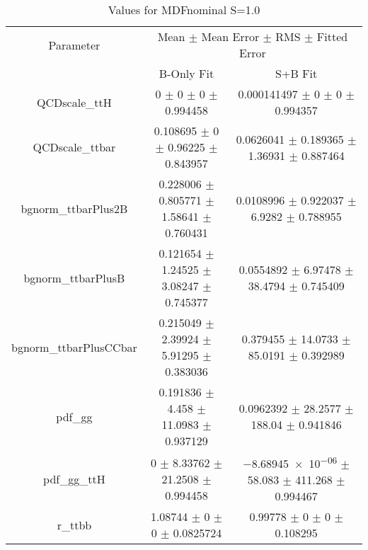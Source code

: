 \begin{table}
\centering
\caption{Values for MDFnominal S=1.0}
\begin{tabular}{ccc}
\toprule
Parameter & \multicolumn{2}{c}{Mean $\pm$ Mean Error $\pm$ RMS $\pm$ Fitted Error}\\
 & B-Only Fit & S+B Fit\\
\midrule
QCDscale\_ttH & \num{0} $\pm$ \num{0} $\pm$ \num{0} $\pm$ \num{0.994458} & \num{0.000141497} $\pm$ \num{0} $\pm$ \num{0} $\pm$ \num{0.994357}\\
QCDscale\_ttbar & \num{0.108695} $\pm$ \num{0} $\pm$ \num{0.96225} $\pm$ \num{0.843957} & \num{0.0626041} $\pm$ \num{0.189365} $\pm$ \num{1.36931} $\pm$ \num{0.887464}\\
bgnorm\_ttbarPlus2B & \num{0.228006} $\pm$ \num{0.805771} $\pm$ \num{1.58641} $\pm$ \num{0.760431} & \num{0.0108996} $\pm$ \num{0.922037} $\pm$ \num{6.9282} $\pm$ \num{0.788955}\\
bgnorm\_ttbarPlusB & \num{0.121654} $\pm$ \num{1.24525} $\pm$ \num{3.08247} $\pm$ \num{0.745377} & \num{0.0554892} $\pm$ \num{6.97478} $\pm$ \num{38.4794} $\pm$ \num{0.745409}\\
bgnorm\_ttbarPlusCCbar & \num{0.215049} $\pm$ \num{2.39924} $\pm$ \num{5.91295} $\pm$ \num{0.383036} & \num{0.379455} $\pm$ \num{14.0733} $\pm$ \num{85.0191} $\pm$ \num{0.392989}\\
pdf\_gg & \num{0.191836} $\pm$ \num{4.458} $\pm$ \num{11.0983} $\pm$ \num{0.937129} & \num{0.0962392} $\pm$ \num{28.2577} $\pm$ \num{188.04} $\pm$ \num{0.941846}\\
pdf\_gg\_ttH & \num{0} $\pm$ \num{8.33762} $\pm$ \num{21.2508} $\pm$ \num{0.994458} & \num{-8.68945e-06} $\pm$ \num{58.083} $\pm$ \num{411.268} $\pm$ \num{0.994467}\\
r\_ttbb & \num{1.08744} $\pm$ \num{0} $\pm$ \num{0} $\pm$ \num{0.0825724} & \num{0.99778} $\pm$ \num{0} $\pm$ \num{0} $\pm$ \num{0.108295}\\
\bottomrule
\end{tabular}
\end{table}